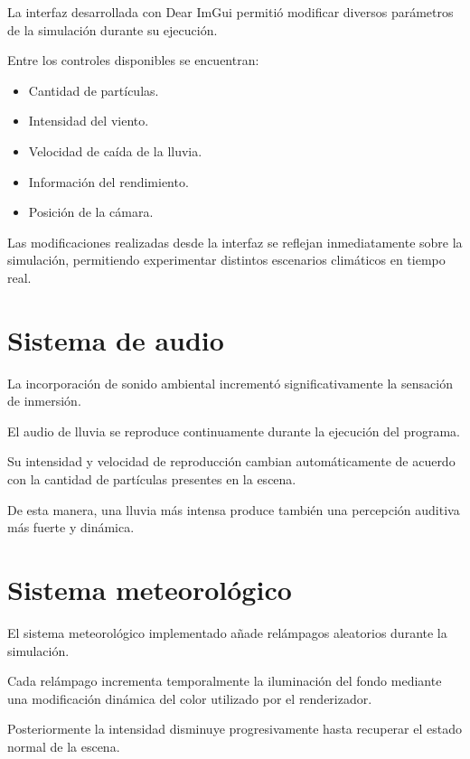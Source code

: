 La interfaz desarrollada con Dear ImGui permitió modificar diversos parámetros de la simulación durante su ejecución.

Entre los controles disponibles se encuentran:

\begin{itemize}

\item Cantidad de partículas.

\item Intensidad del viento.

\item Velocidad de caída de la lluvia.

\item Información del rendimiento.

\item Posición de la cámara.

\end{itemize}

Las modificaciones realizadas desde la interfaz se reflejan inmediatamente sobre la simulación, permitiendo experimentar distintos escenarios climáticos en tiempo real.

\section{Sistema de audio}

La incorporación de sonido ambiental incrementó significativamente la sensación de inmersión.

El audio de lluvia se reproduce continuamente durante la ejecución del programa.

Su intensidad y velocidad de reproducción cambian automáticamente de acuerdo con la cantidad de partículas presentes en la escena.

De esta manera, una lluvia más intensa produce también una percepción auditiva más fuerte y dinámica.

\section{Sistema meteorológico}

El sistema meteorológico implementado añade relámpagos aleatorios durante la simulación.

Cada relámpago incrementa temporalmente la iluminación del fondo mediante una modificación dinámica del color utilizado por el renderizador.

Posteriormente la intensidad disminuye progresivamente hasta recuperar el estado normal de la escena.

